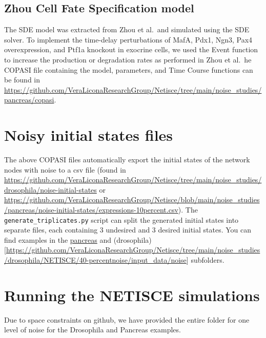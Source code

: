 \documentclass[
]{book}
\begin{document}
\hypertarget{zhou-cell-fate-specification-model}{%
\subsection{Zhou Cell Fate Specification model}\label{zhou-cell-fate-specification-model}}

The SDE model was extracted from Zhou et al.~and simulated using the SDE solver. To implement the time-delay perturbations of MafA, Pdx1, Ngn3, Pax4 overexpression, and Ptf1a knockout in exocrine cells, we used the Event function to increase the production or degradation rates as performed in Zhou et al.~he COPASI file containing the model, parameters, and Time Course functions can be found in \url{https://github.com/VeraLiconaResearchGroup/Netisce/tree/main/noise_studies/pancreas/copasi}.

\hypertarget{noisy-initial-states-files}{%
\section{Noisy initial states files}\label{noisy-initial-states-files}}

The above COPASI files automatically export the initial states of the network nodes with noise to a csv file (found in \url{https://github.com/VeraLiconaResearchGroup/Netisce/tree/main/noise_studies/drosophila/noise-initial-states} or \url{https://github.com/VeraLiconaResearchGroup/Netisce/blob/main/noise_studies/pancreas/noise-initial-states/expressions-10percent.csv}). The \texttt{generate\_triplicates.py} script can split the generated initial states into separate files, each containing 3 undesired and 3 desired initial states. You can find examples in the \href{https://github.com/VeraLiconaResearchGroup/Netisce/tree/main/noise_studies/pancreas/NETISCE/10percent/input_data/noise}{pancreas} and (drosophila){[}\url{https://github.com/VeraLiconaResearchGroup/Netisce/tree/main/noise_studies/drosophila/NETISCE/40-percentnoise/input_data/noise}{]} subfolders.

\hypertarget{running-the-netisce-simulations}{%
\section{Running the NETISCE simulations}\label{running-the-netisce-simulations}}

Due to space constraints on github, we have provided the entire folder for one level of noise for the Drosophila and Pancreas examples.
\end{document}

